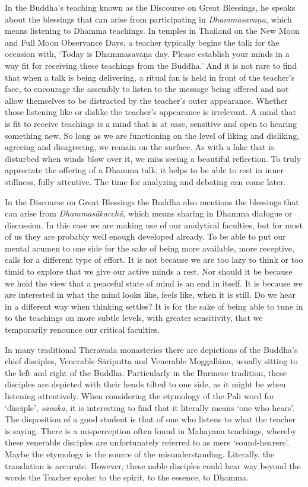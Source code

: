 In the Buddha’s teaching known as the Discourse on Great
Blessings,\cite{mahamangala-sutta}
he speaks about the blessings that can arise from participating in
\emph{Dhammasavaṇa}, which means listening to Dhamma teachings. In temples in
Thailand on the New Moon and Full Moon Observance Days, a teacher
typically begins the talk for the occasion with, ‘Today is Dhammasavaṇa
day. Please establish your minds in a way fit for receiving these
teachings from the Buddha.’ And it is not rare to find that when a talk
is being delivering, a ritual fan is held in front of the teacher’s
face, to encourage the assembly to listen to the message being offered
and not allow themselves to be distracted by the teacher’s outer
appearance. Whether those listening like or dislike the teacher’s
appearance is irrelevant. A mind that is fit to receive teachings is a
mind that is at ease, sensitive and open to hearing something new. So
long as we are functioning on the level of liking and disliking,
agreeing and disagreeing, we remain on the surface. As with a lake that
is disturbed when winds blow over it, we miss seeing a beautiful
reflection. To truly appreciate the offering of a Dhamma talk, it helps
to be able to rest in inner stillness, fully attentive. The time for
analyzing and debating can come later.

In the Discourse on Great Blessings the Buddha also mentions the
blessings that can arise from \emph{Dhammasākacchā}, which means sharing in
Dhamma dialogue or discussion. In this case we are making use of our
analytical faculties, but for most of us they are probably well enough
developed already. To be able to put our mental acumen to one side for
the sake of being more available, more receptive, calls for a different
type of effort. It is not because we are too lazy to think or too timid
to explore that we give our active minds a rest. Nor should it be
because we hold the view that a peaceful state of mind is an end in
itself. It is because we are interested in what the mind looks like,
feels like, when it is still. Do we hear in a different way when
thinking settles? It is for the sake of being able to tune in to the
teachings on more subtle levels, with greater sensitivity, that we
temporarily renounce our critical faculties.

In many traditional Theravada monasteries there are depictions of the
Buddha’s chief disciples, Venerable Sāriputta and Venerable Moggallāna,
usually sitting to the left and right of the Buddha. Particularly in the
Burmese tradition, these disciples are depicted with their heads tilted
to one side, as it might be when listening attentively. When considering
the etymology of the Pali word for ‘disciple’, \emph{sāvaka}, it is
interesting to find that it literally means ‘one who hears’. The
disposition of a good student is that of one who listens to what the
teacher is saying. There is a misperception often found in Mahayana
teachings, whereby these venerable disciples are unfortunately referred
to as mere ‘sound-hearers’. Maybe the etymology is the source of the
misunderstanding. Literally, the translation is accurate. However, these
noble disciples could hear way beyond the words the Teacher spoke: to the
spirit, to the essence, to Dhamma.

